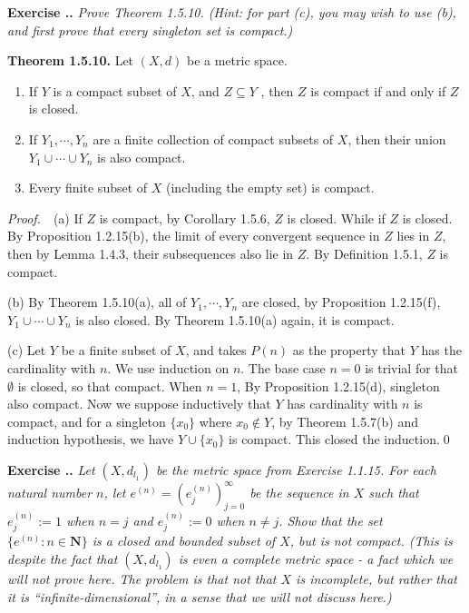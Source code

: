 \documentclass{book}
\newcommand{\pff}{\vspace{.25em}\noindent\emph{Proof.}~~}
\newcommand{\titl}[1]{\noindent\textbf{#1}}
\newcounter{Exercise}[section]
\renewcommand{\theExercise}{\thesection.\arabic{Exercise}.}
\newcommand{\new}{\vspace{1.5em}\noindent\textbf{Exercise \stepcounter{Exercise}\textbf{\theExercise}} }
\begin{document}
\new\emph{Prove Theorem 1.5.10. (Hint: for part (c), you may wish to use (b), and first prove that every singleton set is compact.)}

\begin{framed}
\titl{Theorem 1.5.10.} Let $(X,d)$ be a metric space.
\begin{enumerate}
    \item If $Y$ is a compact subset of $X$, and $Z\subseteq Y$ , then $Z$ is compact if and only if $Z$ is closed.
    \item If $Y_1,\cdots,Y_n$ are a finite collection of compact subsets of $X$, then their union $Y_1\cup\cdots\cup Y_n$ is also compact.
    \item Every finite subset of $X$ (including the empty set) is compact.
\end{enumerate}
\end{framed}

\pff (a) If $Z$ is compact, by Corollary 1.5.6, $Z$ is closed. While if $Z$ is closed. By Proposition 1.2.15(b), the limit of every convergent sequence in $Z$ lies in $Z$, then by Lemma 1.4.3, their subsequences also lie in $Z$. By Definition 1.5.1, $Z$ is compact.

(b) By Theorem 1.5.10(a), all of $Y_1,\cdots,Y_n$ are closed, by Proposition 1.2.15(f), $Y_1\cup\cdots\cup Y_n$ is also closed. By Theorem 1.5.10(a) again, it is compact.

(c) Let $Y$ be a finite subset of $X$, and takes $P(n)$ as the property that $Y$ has the cardinality with $n$. We use induction on $n$. The base case $n=0$ is trivial for that $\emptyset$ is closed, so that compact. When $n=1$, By Proposition 1.2.15(d), singleton also compact. Now we suppose inductively that $Y$ has cardinality with $n$ is compact, and for a singleton $\{x_0\}$ where $x_0\notin Y$, by Theorem 1.5.7(b) and induction hypothesis, we have $Y\cup\{x_0\}$ is compact. This closed the induction.\qed

\new\emph{Let $(X,d_{l_1})$ be the metric space from Exercise 1.1.15. For each natural number $n$, let $e^{(n)}= (e^{(n)}_j)_{j=0}^{\infty}$ be the sequence in $X$ such that $e^{(n)}_j:=1$ when $n=j$ and $e^{(n)}_j:=0$ when $n\neq j$. Show that the set $\{e^{(n)}:n\in\mathbf{N}\}$ is a closed and bounded subset of $X$, but is not compact. (This is despite the fact that $(X,d_{l_1})$ is even a complete metric space - a fact which we will not prove here. The problem is that not that $X$ is incomplete, but rather that it is ``infinite-dimensional'', in a sense that we will not discuss here.)}
\end{document}
